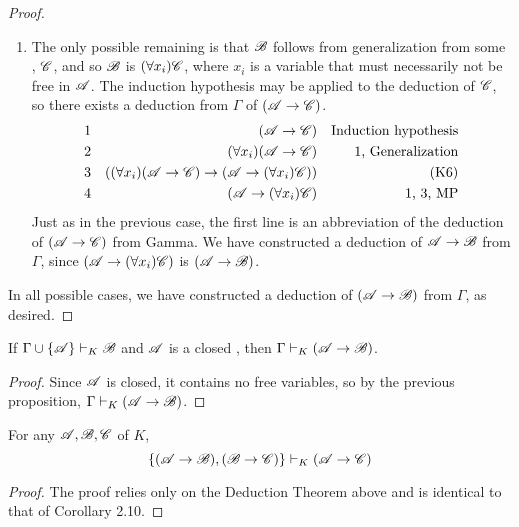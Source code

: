 \begin{proposition}
\begin{proof}
\begin{enumerate}
      \item The only possible remaining is that \(\mathscr{B}\) follows from generalization from some \wf{}, \(\mathscr{C}\), and so \(\mathscr{B}\) is \((\forall x_i) \mathscr{C}\), where \(x_i\) is a variable that must necessarily not be free in \(\mathscr{A}\). The induction hypothesis may be applied to the deduction of \(\mathscr{C}\), so there exists a deduction from \(\Gamma\) of \((\mathscr{A} \rightarrow \mathscr{C})\).
        \begin{align*}
          \text{1}&&
          (\mathscr{A} \rightarrow \mathscr{C})&&
          \text{Induction hypothesis}\\
          \text{2}&&
          (\forall x_i)(\mathscr{A} \rightarrow \mathscr{C})&&
          \text{1, Generalization}\\
          \text{3}&&
          ((\forall x_i)(\mathscr{A} \rightarrow \mathscr{C}) \rightarrow (\mathscr{A} \rightarrow (\forall x_i)\mathscr{C}))&&
          \text{(K6)}\\
          \text{4}&&
          (\mathscr{A} \rightarrow (\forall x_i)\mathscr{C})&&
          \text{1, 3, MP}
        \end{align*}
        Just as in the previous case, the first line is an abbreviation of the deduction of \((\mathscr{A} \rightarrow \mathscr{C})\) from Gamma. We have constructed a deduction of \(\mathscr{A} \rightarrow \mathscr{B}\) from \(\Gamma\), since \((\mathscr{A} \rightarrow (\forall x_i)\mathscr{C})\) is \((\mathscr{A} \rightarrow \mathscr{B})\).
    \end{enumerate}

    In all possible cases, we have constructed a deduction of \((\mathscr{A} \rightarrow \mathscr{B})\) from \(\Gamma\), as desired.
  \end{proof}
\end{proposition}

\begin{corollary}
  If \(\Gamma \cup \{\mathscr{A}\} \vdash_{K} \mathscr{B}\) and \(\mathscr{A}\) is a closed \wf{}, then \(\Gamma \vdash_{K} (\mathscr{A} \rightarrow \mathscr{B})\).

  \begin{proof}
    Since \(\mathscr{A}\) is closed, it contains no free variables, so by the previous proposition, \(\Gamma \vdash_{K} (\mathscr{A} \rightarrow \mathscr{B})\).
  \end{proof}
\end{corollary}

\begin{corollary}
  For any \wfs{} \(\mathscr{A}, \mathscr{B}, \mathscr{C}\) of \(K\),
  \[\{(\mathscr{A} \rightarrow \mathscr{B}), (\mathscr{B} \rightarrow \mathscr{C})\} \vdash_{K} (\mathscr{A} \rightarrow \mathscr{C})\]

  \begin{proof}
    The proof relies only on the Deduction Theorem above and is identical to that of Corollary 2.10.
  \end{proof}
\end{corollary}


